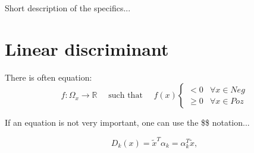 \documentclass{article}
\begin{document}
   \begin{summary}
  Short description of the specifics...
\end{summary}


\section{Linear discriminant}\label{sec:THEORY:linear}

There is often equation:
\begin{equation}
	f: \Omega_x \rightarrow {\mathbb{R}}
	\quad\text{ such that }
	\quad f(x)
	\begin{cases}
		<0 & \forall x\in Neg \\
		\geq 0 & \forall x\in Poz
	\end{cases}
	\label{eq:diszkr:fugg}
\end{equation}



If an equation is not very important, one can use the \$\$ notation...

$$D_k(x)=\tilde{x}^T\alpha_k=\alpha_k^T\tilde{x},$$














 
\end{document}
